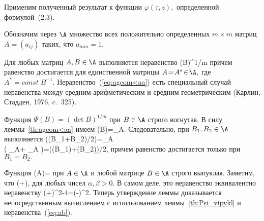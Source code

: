Применим полученный результат к функции $\varphi(\tau,z),$
определенной формулой~(2.3).

Обозначим через $\A$ множество всех положительно определенных
$m\times m$ матриц $A=(a_{ij})$ таких, что $a_{mm}=1.$

\bl
 \label{th:ageom<aa}
 Для любых матриц $A,B\in\A$ выполняется неравенство
 \beq
  (\det B)^{1/m}\le{}
  \label{eq:ageom<aa}
 \eeq
 причем равенство достигается для единственной матрицы $A\!=\!A^*\!\in\!\A,$
 где $A^*\!=\!const\;\!B^{-1}.$
\el \bproof
 Неравенство~(\ref{eq:ageom<aa}) есть специальный случай неравенства между
 средним арифметическим и средним геометрическим
 (Карлин, Стадден, 1976, c.~325).

\bl
 \label{th:Psi_vipykl}
 Функция $\Psi(B)=(\det B)^{1/m}$ при $B\in\A$ строго вогнутая.
\el \bproof В силу леммы~\ref{th:ageom<aa} имеем \bea
 \Psi(B)=\minl_{A\in\A}.
\eea Следовательно, при $B_1,B_2\in\A$ выполняется \bea
 \Psi((B_1+B_2)/2)=\minl_{A\in\A}\ge
 \qquad\qquad\qquad\qquad\\
 \ge{}\left(
 \minl_{A\in\A}+
 \minl_{A\in\A}
 \right)=(\Psi(B_1)+\Psi(B_2))/2,
\eea причем равенство достигается только при $B_1=B_2.$ %

\bl
 Функция
 \bea
  \Psi(A)=
 \eea
 при $A\in\A$ и любой матрице $B\in\A$ строго выпуклая.
\el \bproof Заметим, что \beq
 \le{}
 \left(+\right),
 \label{eq:ab}
\eeq для любых чисел $\alpha,\beta>0.$ В самом деле, это неравенство
эквивалентно неравенству \bea
 (\alpha+\beta)^2-4\alpha\beta=(\alpha-\beta)^2.
\eea Теперь утверждение леммы доказывается непосредственным
вычислением с использованием леммы~\ref{th:Psi_vipykl} и
неравенства~(\ref{eq:ab}).

